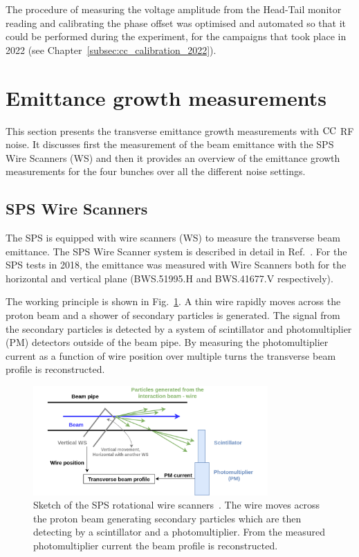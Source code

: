 The procedure of measuring the voltage amplitude from the Head-Tail monitor reading and calibrating the phase offset was optimised and automated so that it could be performed during the experiment, for the campaigns that took place in 2022 (see Chapter~\ref{subsec:cc_calibration_2022}). 

\section{Emittance growth measurements}\label{sec:emit_growth_meas_2018}
This section presents the transverse emittance growth measurements with ${\mathrm{CC}}$ RF noise. It discusses first the measurement of the beam emittance with the SPS Wire Scanners (WS) and then it provides an overview of the emittance growth measurements for the four bunches over all the different noise settings.

\subsection{SPS Wire Scanners}\label{subsec:sps_ws}
The SPS is equipped with wire scanners (WS) to measure the transverse beam emittance. The SPS Wire Scanner system is described in detail in Ref.~\cite{BOSSER1985475, Berrig:1972478}. For the SPS tests in 2018, the emittance was measured with Wire Scanners both for the horizontal and vertical plane (BWS.51995.H and BWS.41677.V respectively).

The working principle is shown in Fig.~\ref{fig:SPS_WS_ROT}. A thin wire rapidly moves across the proton beam and a shower of secondary particles is generated. The signal from the secondary particles is detected by a system of scintillator and photomultiplier (PM) detectors outside of the beam pipe. By measuring the photomultiplier current as a function of wire position over multiple turns the transverse beam profile is reconstructed. 

\begin{figure}[!h]
   \centering         
   \includegraphics[width=0.8\textwidth]{images/Ch5/Wire_scanner.png}
       \caption{Sketch of the SPS rotational wire scanners~\cite{Berrig:1972478}. The wire moves across the proton beam generating secondary particles which are then detecting by a scintillator and a photomultiplier. From the measured photomultiplier current the beam profile is reconstructed.}
       \label{fig:SPS_WS_ROT}
\end{figure}
